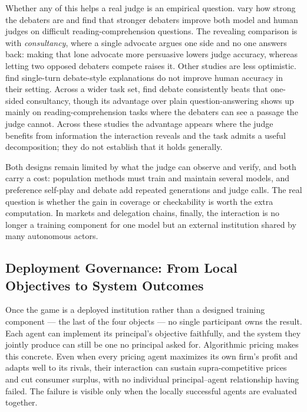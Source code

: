  Whether any of this helps a real judge is an empirical question.
\citet{Khan2024} vary how strong the debaters are and find that stronger debaters
improve both model and human judges on difficult reading-comprehension questions. The
revealing comparison is with \emph{consultancy}, where a single advocate argues one
side and no one answers back: making that lone advocate more persuasive lowers judge
accuracy, whereas letting two opposed debaters compete raises it. Other studies are less optimistic. \citet{Parrish2022} find single-turn debate-style explanations do not improve
human accuracy in their setting. Across a wider task set, \citet{Kenton2024}
find debate consistently beats that one-sided consultancy, though its
advantage over plain question-answering shows up mainly on
reading-comprehension tasks where the debaters can see a passage the judge
cannot. Across these studies the advantage appears where the judge benefits from
information the interaction reveals and the task admits a useful decomposition; they
do not establish that it holds generally.

Both designs remain limited by what the judge can observe and verify, and both
carry a cost: population methods must train and maintain several
models, and preference self-play and debate add repeated generations and judge
calls. The real question is whether the gain in coverage or checkability is
worth the extra computation. In markets and delegation chains, finally, the interaction is no longer a
training component for one model but an external institution shared by many autonomous
actors.


\subsection{Deployment Governance: From Local Objectives to System Outcomes}
\label{sec:gt4ai:governance}

Once the game is a deployed institution rather than a designed training component ---
the last of the four objects --- no single participant owns the result. Each agent can implement its principal's objective
faithfully, and the system they jointly produce can still be one no principal asked
for. Algorithmic pricing makes this concrete. Even when every pricing agent
maximizes its own firm's profit and adapts well to its rivals, their interaction can
sustain supra-competitive prices and cut consumer surplus, with no individual
principal--agent relationship having failed. The failure is visible only when the
locally successful agents are evaluated together.

